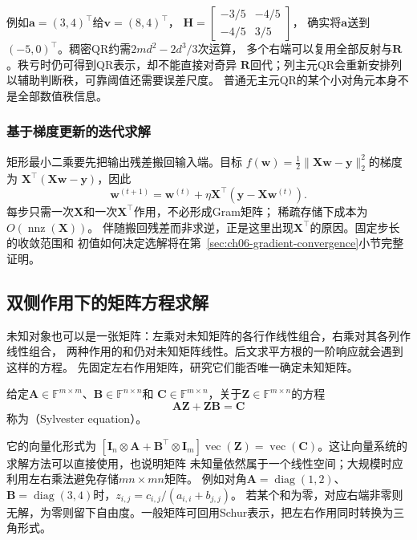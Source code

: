 例如$\bm a=(3,4)^\top$给$\bm v=(8,4)^\top$，
$\bm H=\left[\begin{smallmatrix}-3/5&-4/5\\-4/5&3/5\end{smallmatrix}\right]$，
确实将$\bm a$送到$(-5,0)^\top$。稠密QR约需$2md^2-2d^3/3$次运算，
多个右端可以复用全部反射与$\bm R$。秩亏时仍可得到QR表示，却不能直接对奇异
$\bm R$回代；列主元QR会重新安排列以辅助判断秩，可靠阈值还需要误差尺度。
普通无主元QR的某个小对角元本身不是全部数值秩信息。

\subsubsection{基于梯度更新的迭代求解}
\label{sec:linear-algebra-gradient-residual}

矩形最小二乘要先把输出残差搬回输入端。目标
$f(\bm w)=\tfrac12\lVert\bm X\bm w-\bm y\rVert_2^2$的梯度为
$\bm X^\top(\bm X\bm w-\bm y)$，因此
\begin{equation}
 \bm w^{(t+1)}
 =\bm w^{(t)}+\eta\bm X^\top(\bm y-\bm X\bm w^{(t)}).
 \label{eq:ch06-least-squares-gradient-update}
\end{equation}
每步只需一次$\bm X$和一次$\bm X^\top$作用，不必形成Gram矩阵；
稀疏存储下成本为$O(\operatorname{nnz}(\bm X))$。
伴随搬回残差而非求逆，正是这里出现$\bm X^\top$的原因。固定步长的收敛范围和
初值如何决定选解将在第~\ref{sec:ch06-gradient-convergence}小节完整证明。

\subsection{双侧作用下的矩阵方程求解}
\label{sec:linear-algebra-matrix-equations}

未知对象也可以是一张矩阵：左乘对未知矩阵的各行作线性组合，右乘对其各列作线性组合，
两种作用的和仍对未知矩阵线性。后文求平方根的一阶响应就会遇到这样的方程。
先固定左右作用矩阵，研究它们能否唯一确定未知矩阵。

\begin{definition}[Sylvester方程]
\label{def:matrix-analysis-sylvester-equation}
给定$\bm A\in\mathbb F^{m\times m}$、$\bm B\in\mathbb F^{n\times n}$和
$\bm C\in\mathbb F^{m\times n}$，关于$\bm Z\in\mathbb F^{m\times n}$的方程
\[
 \bm A\bm Z+\bm Z\bm B=\bm C
\]
称为（Sylvester equation）。
\end{definition}
它的向量化形式为
$[\bm I_n\otimes\bm A+\bm B^\top\otimes\bm I_m]\operatorname{vec}(\bm Z)
=\operatorname{vec}(\bm C)$。这让向量系统的求解方法可以直接使用，也说明矩阵
未知量依然属于一个线性空间；大规模时应利用左右乘法避免存储$mn\times mn$矩阵。
例如对角$\bm A=\operatorname{diag}(1,2)$、
$\bm B=\operatorname{diag}(3,4)$时，$z_{i,j}=c_{i,j}/(a_{i,i}+b_{j,j})$。
若某个和为零，对应右端非零则无解，为零则留下自由度。一般矩阵可回用Schur表示，把左右作用同时转换为三角形式。


